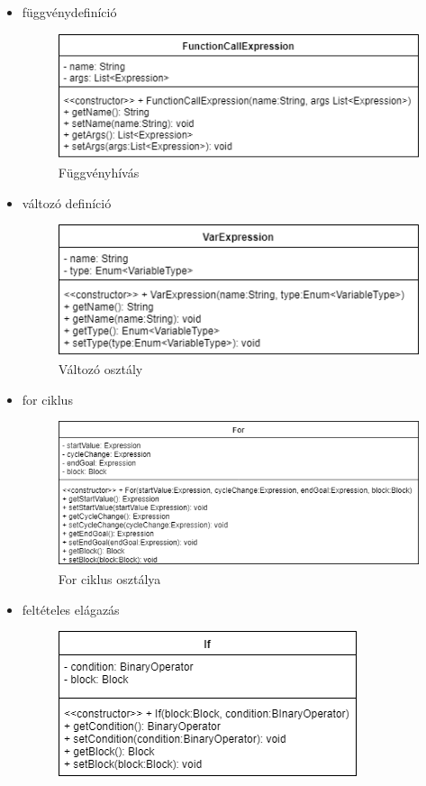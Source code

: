\begin{itemize}
\item függvénydefiníció
\begin{figure}
\centering
\includegraphics[scale=1]{kepek/rr_funccallexpr_dia.png}
\caption{Függvényhívás}
\label{fig:process}
\end{figure}
\item változó definíció
\begin{figure}
\centering
\includegraphics[scale=1]{kepek/rr_var_dia.png}
\caption{Változó osztály}
\label{fig:process}
\end{figure}
\item for ciklus
\begin{figure}
\centering
\includegraphics[scale=1]{kepek/rr_for_dia.png}
\caption{For ciklus osztálya}
\label{fig:process}
\end{figure}
\item feltételes elágazás
\begin{figure}
\centering
\includegraphics[scale=1]{kepek/rr_if_dia.png}

\end{figure}
\end{itemize}
